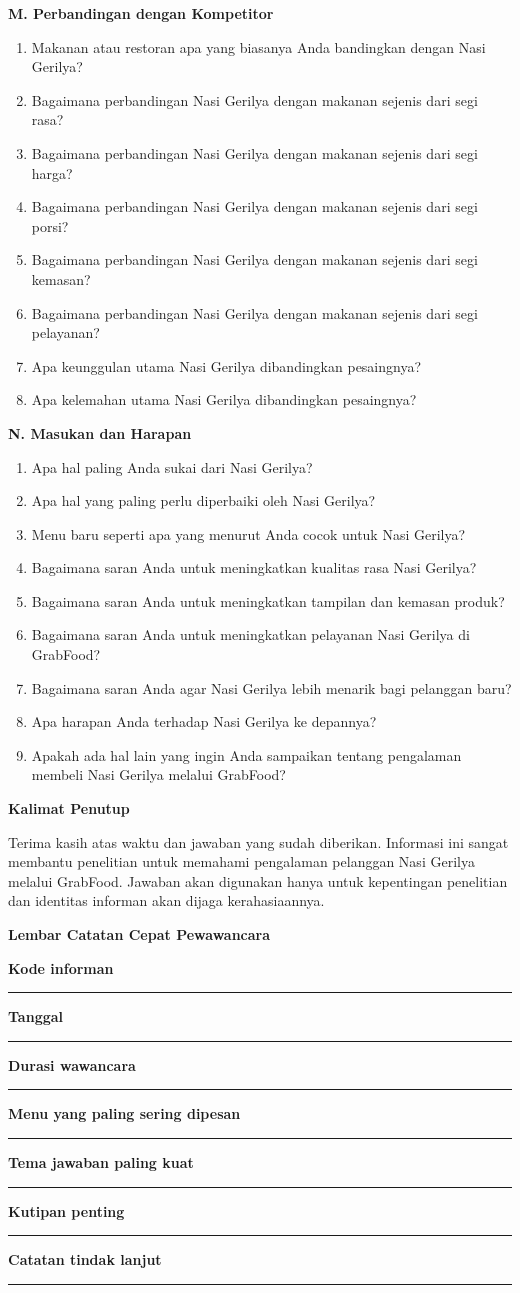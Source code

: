 \documentclass[10pt,a4paper]{article}
\newcommand{\sectionbar}[1]{%
  \Needspace{5\baselineskip}
  \vspace{4mm}
  \noindent\colorbox{Soft}{%
    \parbox{\dimexpr\linewidth-2\fboxsep\relax}{%
      \large\bfseries\textcolor{Primary}{#1}
    }%
  }\par\vspace{1mm}
}
\newcommand{\probe}[1]{%
  \vspace{1mm}
  \noindent{\small\textbf{\textcolor{Accent}{Probing:}} \textcolor{TextGray}{#1}}\par
}
\newcommand{\notefield}[1]{%
  \textbf{\textcolor{Primary}{#1}}\par
  \noindent\textcolor{LineGray}{\rule{\linewidth}{0.35pt}}\par\vspace{3.5mm}
}
\begin{document}
\sectionbar{M. Perbandingan dengan Kompetitor}
\begin{enumerate}[label=\arabic*.,leftmargin=*,itemsep=1.2mm,resume]
\item Makanan atau restoran apa yang biasanya Anda bandingkan dengan Nasi Gerilya?
\item Bagaimana perbandingan Nasi Gerilya dengan makanan sejenis dari segi rasa?
\item Bagaimana perbandingan Nasi Gerilya dengan makanan sejenis dari segi harga?
\item Bagaimana perbandingan Nasi Gerilya dengan makanan sejenis dari segi porsi?
\item Bagaimana perbandingan Nasi Gerilya dengan makanan sejenis dari segi kemasan?
\item Bagaimana perbandingan Nasi Gerilya dengan makanan sejenis dari segi pelayanan?
\item Apa keunggulan utama Nasi Gerilya dibandingkan pesaingnya?
\item Apa kelemahan utama Nasi Gerilya dibandingkan pesaingnya?
\end{enumerate}
\probe{Jika informan menyebut pesaing tertentu, catat nama pesaing dan alasan perbandingannya.}

\sectionbar{N. Masukan dan Harapan}
\begin{enumerate}[label=\arabic*.,leftmargin=*,itemsep=1.2mm,resume]
\item Apa hal paling Anda sukai dari Nasi Gerilya?
\item Apa hal yang paling perlu diperbaiki oleh Nasi Gerilya?
\item Menu baru seperti apa yang menurut Anda cocok untuk Nasi Gerilya?
\item Bagaimana saran Anda untuk meningkatkan kualitas rasa Nasi Gerilya?
\item Bagaimana saran Anda untuk meningkatkan tampilan dan kemasan produk?
\item Bagaimana saran Anda untuk meningkatkan pelayanan Nasi Gerilya di GrabFood?
\item Bagaimana saran Anda agar Nasi Gerilya lebih menarik bagi pelanggan baru?
\item Apa harapan Anda terhadap Nasi Gerilya ke depannya?
\item Apakah ada hal lain yang ingin Anda sampaikan tentang pengalaman membeli Nasi Gerilya melalui GrabFood?
\end{enumerate}
\probe{Akhiri dengan memberi ruang bagi informan untuk menambahkan hal yang belum sempat ditanyakan.}

\sectionbar{Kalimat Penutup}
Terima kasih atas waktu dan jawaban yang sudah diberikan. Informasi ini sangat membantu penelitian untuk memahami pengalaman pelanggan Nasi Gerilya melalui GrabFood. Jawaban akan digunakan hanya untuk kepentingan penelitian dan identitas informan akan dijaga kerahasiaannya.

\sectionbar{Lembar Catatan Cepat Pewawancara}
\notefield{Kode informan}
\notefield{Tanggal}
\notefield{Durasi wawancara}
\notefield{Menu yang paling sering dipesan}
\notefield{Tema jawaban paling kuat}
\notefield{Kutipan penting}
\notefield{Catatan tindak lanjut}
\end{document}
